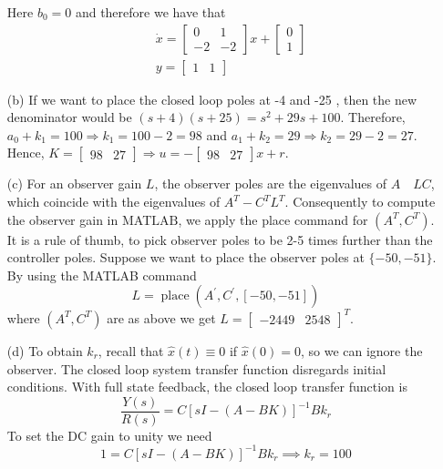 \documentclass[12pt]{article}
\begin{document}
\begin{itemize}
Here $b_0=0$ and therefore we have that
$$
\begin{aligned}
& \dot{x}=\left[\begin{array}{cc}
0 & 1 \\
-2 & -2
\end{array}\right] x+\left[\begin{array}{l}
0 \\
1
\end{array}\right] \\
& y=\left[\begin{array}{ll}
1 & 1
\end{array}\right]
\end{aligned}
$$
\item [(b)] If we want to place the closed loop poles at -4 and -25 , then the new denominator would be $(s+4)(s+25)=s^2+29 s+100$. Therefore, $a_0+k_1=100 \Longrightarrow k_1=100-2=98$ and $a_1+k_2=29 \Longrightarrow k_2=29-2=27$. Hence, $K=\left[\begin{array}{ll}98 & 27\end{array}\right] \Longrightarrow u=-\left[\begin{array}{ll}98 & 27\end{array}\right] x+r$.
\item [(c)] For an observer gain $L$, the observer poles are the eigenvalues of $A \quad L C$, which coincide with the eigenvalues of $A^T-C^T L^T$. Consequently to compute the observer gain in MAT$\mathrm{LAB}$, we apply the place command for $\left(A^T, C^T\right)$. It is a rule of thumb, to pick observer poles to be 2-5 times further than the controller poles. Suppose we want to place the observer poles at $\{-50,-51\}$. By using the MATLAB command
$$ L=\operatorname{place}\left(A^{\prime}, C^{\prime},[-50,-51]\right) $$
where $\left(A^T, C^T\right)$ are as above we get $L=\left[\begin{array}{ll}-2449 & 2548\end{array}\right]^T$.

\item [(d)] To obtain $k_r$, recall that $\hat{x}(t) \equiv 0$ if $\hat{x}(0) = 0$, so we can ignore the observer. The closed loop system transfer function disregards initial conditions. With full state feedback, the
closed loop transfer function is
$$\frac{Y(s)}{R(s)}=C [s I-(A- B K)]^{-1}B k_r$$
To set the DC gain to unity we need
$$1 = C [s I-(A- B K)]^{-1}B k_r \implies  k_r = 100$$

\end{itemize}
\clearpage
\end{document}
